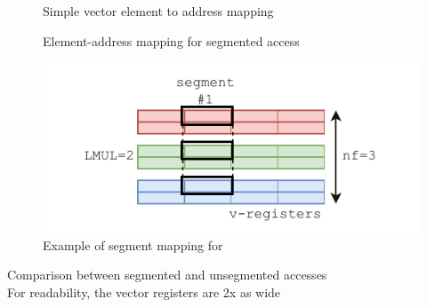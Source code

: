 \figcheckinputs{}
\expandafter\figure\expandafter[\figinputPos]
    \centering
    \begin{subfigure}[t]{\figinputWidth}
        \centering
        \caption{Simple vector element to address mapping}
        \label{fig:RVV_mem_unit_noseg}
    \end{subfigure}
    \hfill
    \begin{subfigure}[t]{\figinputWidth}
        \centering
        \caption{Element-address mapping for segmented access}
        \label{fig:RVV_mem_unit_3seg}
    \end{subfigure}
    
    \begin{subfigure}[t]{\figinputWidth}
        \centering
     \includegraphics[width=\textwidth]{Figures/RVV_mem_lmul_3seg.pdf}
        \caption{Example of segment mapping for }
        \label{fig:RVV_mem_lmul_3seg}
    \end{subfigure}
    \caption{Comparison between segmented and unsegmented accesses\\For readability, the vector registers are 2x as wide}
    \label{fig:RVV_mem_unit}
\endfigure